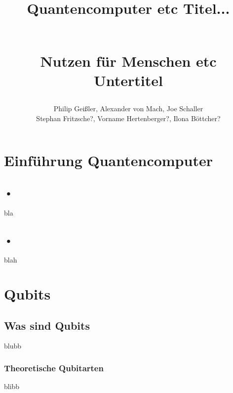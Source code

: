 \documentclass[12pt]{report}
\begin{document}
 
  
\title{\begin{Huge}\textbf{Quantencomputer etc Titel...}\end{Huge}\\		%
Nutzen für Menschen etc Untertitel}											%
\author{Philip Geißler, Alexander von Mach, Joe Schaller\\					%
Stephan Fritzsche?, Vorname Hertenberger?, Ilona Böttcher?}					%
\maketitle


\chapter{Einführung Quantencomputer}
\section{•}
bla
\section{•}
blah
\chapter{Qubits}							%
\section{Was sind Qubits}					%
blubb
\subsection{Theoretische Qubitarten}		%
blibb
\end{document}
